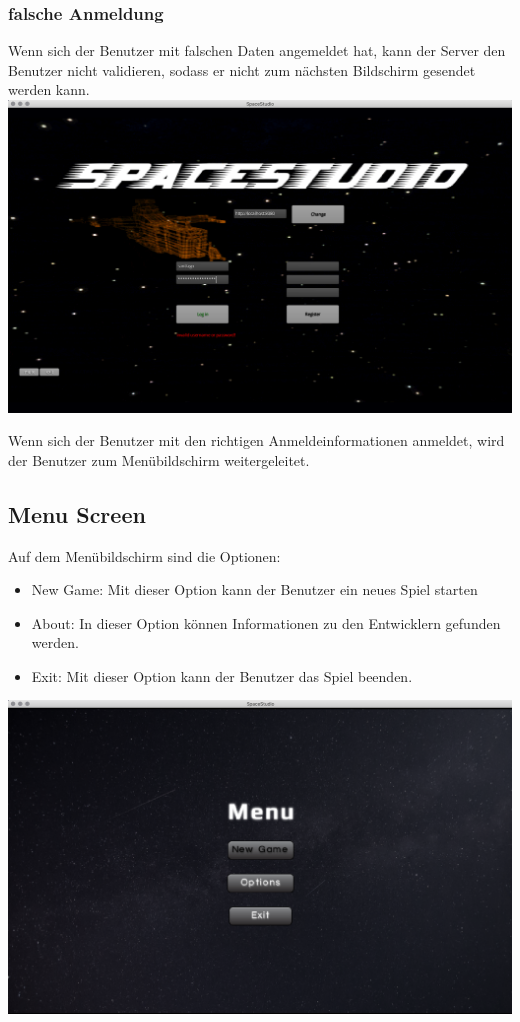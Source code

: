 \documentclass[11pt]{article}
\begin{document}
\subsubsection{ falsche Anmeldung}
Wenn sich der Benutzer mit falschen Daten angemeldet hat, kann der Server den Benutzer nicht validieren, sodass er nicht zum nächsten Bildschirm gesendet werden kann.\\
\includegraphics[scale=0.2]{TestProtocolBilder/invalidCredentials.png}

Wenn sich der Benutzer mit den richtigen Anmeldeinformationen anmeldet, wird der Benutzer zum Menübildschirm weitergeleitet.


\subsection{Menu Screen}
Auf dem Menübildschirm sind die Optionen:
\begin{itemize}
\item New Game: Mit dieser Option kann der Benutzer ein neues Spiel starten
\item About: In dieser Option können Informationen zu den Entwicklern gefunden werden.
\item Exit: Mit dieser Option kann der Benutzer das Spiel beenden.
\end{itemize}

\includegraphics[scale=0.2]{TestProtocolBilder/menuScreen.png}
\end{document}
